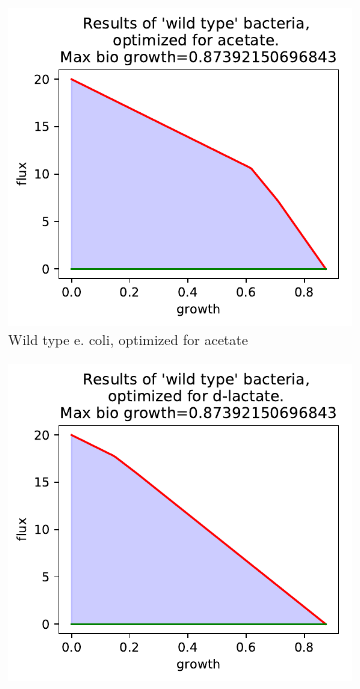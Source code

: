 \documentclass{scrartcl}
\begin{document}
   \begin{figure}[h]
      \centering
      \begin{subfigure}{.49\textwidth}
         \centering
         \includegraphics[width=\linewidth]{q1_results/result_q1_acetate_wild_type.pdf}
         \caption{Wild type e. coli, optimized for acetate}
         \label{fig:acetate_wild_type}
      \end{subfigure}%
      \begin{subfigure}{.49\textwidth}
         \centering
         \includegraphics[width=\linewidth]{q1_results/result_q1_d-lactate_wild_type.pdf}

\end{subfigure}
\end{figure}
\end{document}
